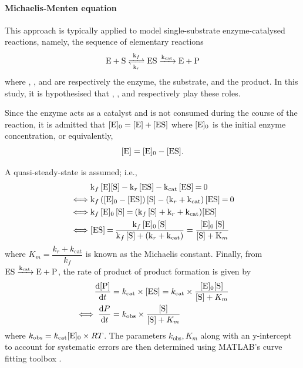 \documentclass[a4paper, 12pt]{article}
\begin{document}
\paragraph{Michaelis-Menten equation}
This approach is typically applied to model single-substrate enzyme-catalysed reactions, namely, the sequence of elementary reactions
\[
\ce{E + S <=>[ k_f ][ k_r ] ES ->[ k_{\text{cat}} ] E + P}
\]
where , , and  are respectively the enzyme, the substrate, and the product. In this study, it is hypothesised that , , and  respectively play these roles.

Since the enzyme acts as a catalyst and is not consumed during the course of the reaction, it is admitted that $\ce{[E]_0} = \ce{[E] + [ES]}$ where $\ce{[E]_0}$ is the initial enzyme concentration, or equivalently, 
\[
\ce{[E]} = \ce{[E]_0 - [ES]}.
\]

A quasi-steady-state is assumed; i.e., 
\begin{align*}
    &\ce{k_f [E][S] - k_r [ES] - k_{\text{cat}} [ES] = 0}\\
    \iff &\ce{k_f ([E]_0 - [ES]) [S] - (k_r + k_{\text{cat}}) [ES] = 0}\\
    \iff &\ce{k_f [E]_0 [S] = (k_f [S] + k_r + k_{\text{cat}})[ES]}\\
    \iff &\ce{[ES] = \frac{k_f [E]_0 [S]}{k_f [S] + (k_r + k_{\text{cat}})}}
    = \ce{\frac{[E]_0 [S]}{[S] + K_m}}
\end{align*}
where $K_m = \dfrac{k_r + k_\text{cat}}{k_f}$ is known as the Michaelis constant. Finally, from $\ce{ES ->[k_{\text{cat}}] E + P}$, the rate of product of product formation is given by
\begin{align}
    \dv{\ce{[P]}}{t} &= k_{\text{cat}} \times \ce{[ES]} = k_{\text{cat}} \times \frac{\ce{[E]_0[S]}}{\ce{[S]} + K_m}
\nonumber\\
    \iff \dv{P}{t} &= k_{\text{obs}} \times \frac{\ce{[S]}}{\ce{[S]} + K_m}\label{eq:mm}
\end{align}
where $k_{\text{obs}} = k_\text{cat} \ce{[E]_0} \times R T$. The parameters $k_{\text{obs}}, K_m$ along with an y-intercept to account for systematic errors are then determined using MATLAB's curve fitting toolbox \cite{matlab}.
\end{document}
